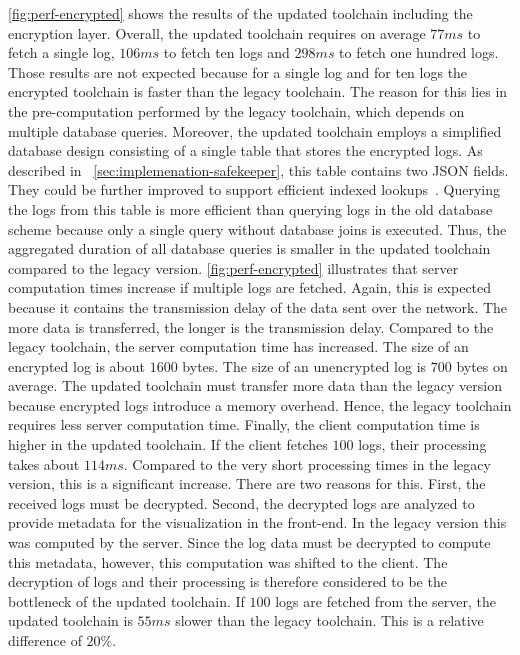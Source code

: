 \documentclass[../main.tex]{subfiles}
\begin{document}
\cref{fig:perf-encrypted} shows the results of the updated toolchain including the encryption layer.
Overall, the updated toolchain requires on average $77ms$ to fetch a single log, $106ms$ to fetch ten logs and $298ms$ to fetch one hundred logs.
Those results are not expected because for a single log and for ten logs the encrypted toolchain is faster than the legacy toolchain.
The reason for this lies in the pre-computation performed by the legacy toolchain, which depends on multiple database queries.
Moreover, the updated toolchain employs a simplified database design consisting of a single table that stores the encrypted logs.
As described in ~\cref{sec:implemenation-safekeeper}, this table contains two JSON fields.
They could be further improved to support efficient indexed lookups~\cite{Shang2021}.
Querying the logs from this table is more efficient than querying logs in the old database scheme because only a single query without database joins is executed.
Thus, the aggregated duration of all database queries is smaller in the updated toolchain compared to the legacy version.
\cref{fig:perf-encrypted} illustrates that server computation times increase if multiple logs are fetched.
Again, this is expected because it contains the transmission delay of the data sent over the network.
The more data is transferred, the longer is the transmission delay.
Compared to the legacy toolchain, the server computation time has increased.
The size of an encrypted log is about $1600$ bytes.
The size of an unencrypted log is $700$ bytes on average.
The updated toolchain must transfer more data than the legacy version because encrypted logs introduce a memory overhead.
Hence, the legacy toolchain requires less server computation time.
Finally, the client computation time is higher in the updated toolchain.
If the client fetches $100$ logs, their processing takes about $114ms$.
Compared to the very short processing times in the legacy version, this is a significant increase.
There are two reasons for this.
First, the received logs must be decrypted.
Second, the decrypted logs are analyzed to provide metadata for the visualization in the front-end.
In the legacy version this was computed by the server.
Since the log data must be decrypted to compute this metadata, however, this computation was shifted to the client.
The decryption of logs and their processing is therefore considered to be the bottleneck of the updated toolchain.
If $100$ logs are fetched from the server, the updated toolchain is $55ms$ slower than the legacy toolchain.
This is a relative difference of $20\%$.
\end{document}
